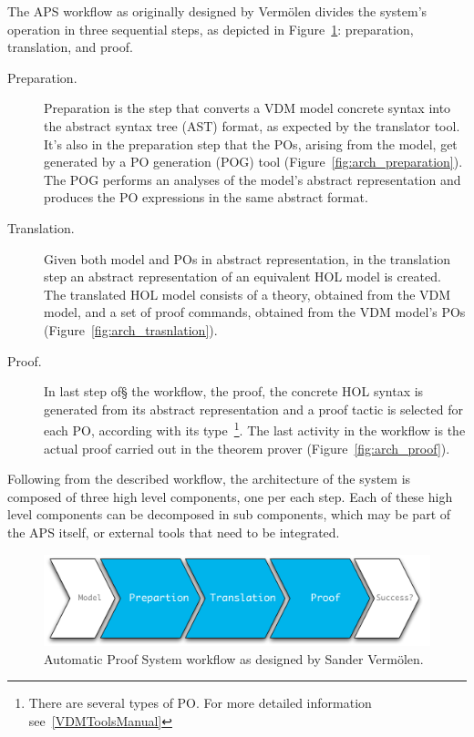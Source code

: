 \documentclass[]{article}
\begin{document}
The APS workflow as originally designed by Verm\"olen divides the system's operation in three sequential steps, as depicted in Figure~\ref{fig:sander_arch}: preparation, translation, and proof.

\begin{description}
  \item[Preparation.] Preparation is the step that converts a VDM model concrete syntax into the abstract syntax tree (AST) format, as expected by the translator tool.
	It's also in the preparation step that the POs, arising from the model, get generated by a PO generation (POG) tool (Figure~\ref{fig:arch_preparation}).
The POG performs an analyses of the model's abstract representation and produces the PO expressions in the same abstract format.

  \item[Translation.] Given both model and POs in abstract representation, in the translation step an abstract representation of an equivalent HOL model is created. 
	The translated HOL model consists of a theory, obtained from the VDM model, and a set of proof commands, obtained from the VDM model's POs (Figure~\ref{fig:arch_trasnlation}).

  \item[Proof.] In last step of§ the workflow, the proof, the concrete HOL syntax is generated from its abstract representation and a proof tactic is selected for each PO, according with its type~\footnote{There are several types of PO. For more detailed information see~\ref{VDMToolsManual}}. The last activity in the workflow is the actual proof carried out in the theorem prover (Figure~\ref{fig:arch_proof}).
\end{description}

Following from the described workflow, the architecture of the system is composed of three high level components, one per each step.
Each of these high level components can be decomposed in sub components, which may be part of the APS itself, or external tools that need to be integrated.

\begin{figure}
  \begin{center}
    \includegraphics[width=\textwidth]{images/pic_arch.pdf}
    \caption[APS workflow]{Automatic Proof System workflow as designed by Sander Verm\"olen.}
    \label{fig:sander_arch}
  \end{center}
\end{figure}
\end{document}
